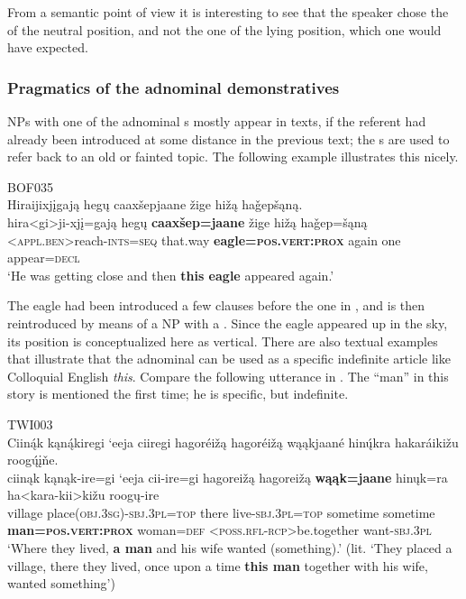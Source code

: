 \documentclass[output=paper]{langsci/langscibook}
\begin{document}
From a semantic point of view it is interesting to see that the speaker chose the  of the neutral position, and not the one of the lying position, which one would have expected. 

\subsubsection{{Pragmatics of the adnominal demonstratives}}\label{sec:helmbrecht:3.1.2}

NPs with one of the adnominal s mostly appear in texts, if the referent had already been introduced at some distance in the previous text; the s are used to refer back to an old or fainted topic. The following example illustrates this nicely.\largerpage[2]

 \ea \label{ex:helmbrecht:15}
BOF035\\
\glll    Hiraijixjįgają hegų caaxšepjaane žige hižą ha\v{g}epšąną.\\
    hira<gi>ji-xjį=gają  hegų  \textbf{caaxšep=jaane}                  žige    hižą  ha\v{g}ep=šąną\\
    <\textsc{appl}.\textsc{ben}>reach-\textsc{ints}=\textsc{seq}   that.way    \textbf{eagle=}\textbf{\textsc{pos}.\textsc{vert}:\textsc{prox}} again  one   appear=\textsc{decl}\\
\glt `He was getting close and then \textbf{this eagle} appeared again.'
\z

The eagle had been introduced a few clauses before the one in , and is then reintroduced by means of a NP with a  . Since the eagle appeared up in the sky, its position is conceptualized here as vertical. 
There are also textual examples that illustrate that the  adnominal  can be used as a specific indefinite article like Colloquial English \textit{this}. Compare the following utterance in . The ``man'' in this story is mentioned the first time; he is specific, but indefinite.

\ea  \label{ex:helmbrecht:16}
TWI003\\
\glll Ciin\'{ą}k kąn\'{ą}kiregi `eeja ciiregi hagoréižą hagoréižą wąąkjaané hin\'{\k{u}}kra       hakaráikižu roog\'{\k{u}}įňe.\\
    ciinąk  kąnąk-ire=gi                             `eeja  cii-ire=gi hagoreižą  hagoreižą \textbf{wąąk=jaane}      hinųk=ra ha<kara-kii>kižu      roogų-ire\\
    village  place(\textsc{obj}.\textsc{3sg})-\textsc{sbj}.\textsc{3pl}=\textsc{top}   there  live-\textsc{sbj}.\textsc{3pl}=\textsc{top} sometime  sometime  \textbf{man=}\textbf{\textsc{pos}.\textsc{vert}:\textsc{prox}}  woman=\textsc{def} <\textsc{poss}.\textsc{rfl}-\textsc{rcp}>be.together    want-\textsc{sbj}.\textsc{3pl}\\
   \glt    `Where they lived, \textbf{a man} and his wife wanted (something).'
    (lit. `They placed a village, there they lived, once upon a time \textbf{this man} together     with his wife, wanted something')
\z
\end{document}
